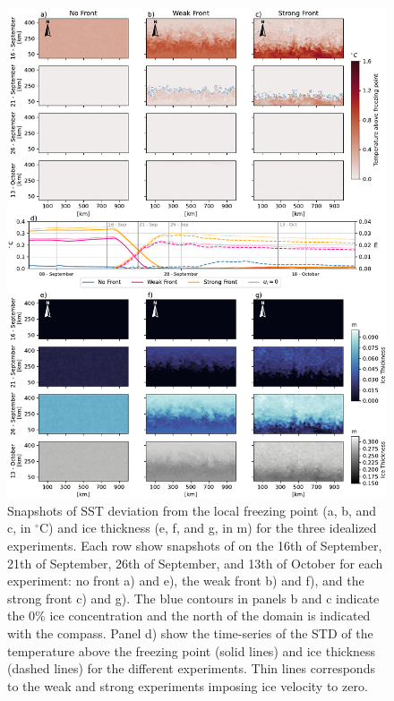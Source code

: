 \documentclass[draft]{agujournal2019}
\begin{document}
\begin{figure}
    \includegraphics[width=1\textwidth]{Fig_2_combined_new.pdf}
    \caption{Snapshots of SST deviation from the local freezing point (a, b, and c, in $^\circ$C) and ice thickness (e, f, and g, in m) for the three idealized experiments. Each row show snapshots of on the 16th of September, 21th of September, 26th of September, and 13th of October for each experiment: no front a) and e), the weak front b) and f), and the strong front c) and g). The blue contours in panels b and c indicate the 0\% ice concentration and the north of the domain is indicated with the compass.
    Panel d) show the time-series of the STD of the temperature above the freezing point (solid lines) and ice thickness (dashed lines) for the different experiments. Thin lines corresponds to the weak and strong experiments imposing ice velocity to zero. } 
    \label{fig:fig2}
\end{figure}
\end{document}
